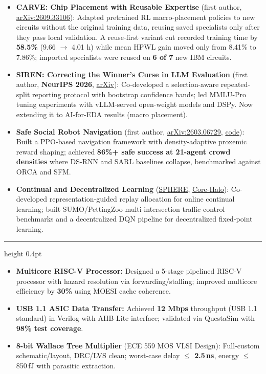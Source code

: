\documentclass[letterpaper,11pt]{article}
\newcommand{\ressection}[1]{%
  \vspace{3pt}%
  \noindent{\large\bfseries\scshape #1}%
  \par\vspace{1pt}%
  \hrule height 0.4pt%
  \vspace{2pt}%
}
\begin{document}
\vspace{2pt}
\begin{itemize}[leftmargin=1.2em, topsep=3pt, itemsep=3pt, parsep=0pt]
  \item \textbf{CARVE: Chip Placement with Reusable Expertise} (first author, \href{https://arxiv.org/abs/2609.33106}{arXiv:2609.33106}): Adapted pretrained RL macro-placement policies to new circuits without the original training data, reusing saved specialists only after they pass local validation. A reuse-first variant cut recorded training time by \textbf{58.5\%} (9.66 $\rightarrow$ 4.01 h) while mean HPWL gain moved only from 8.41\% to 7.86\%; imported specialists were reused on \textbf{6 of 7} new IBM circuits.
  \item \textbf{SIREN: Correcting the Winner's Curse in LLM Evaluation} (first author, \textbf{NeurIPS 2026}, \href{https://arxiv.org/abs/2605.05973}{arXiv}): Co-developed a selection-aware repeated-split reporting protocol with bootstrap confidence bands; led MMLU-Pro tuning experiments with vLLM-served open-weight models and DSPy. Now extending it to AI-for-EDA results (macro placement).
  \item \textbf{Safe Social Robot Navigation} (first author, \href{https://arxiv.org/abs/2603.06729}{arXiv:2603.06729}, \href{https://github.com/jefferyz001/PSS-Social}{code}): Built a PPO-based navigation framework with density-adaptive proxemic reward shaping; achieved \textbf{86\%+ safe success at 21-agent crowd densities} where DS-RNN and SARL baselines collapse, benchmarked against ORCA and SFM.
  \item \textbf{Continual and Decentralized Learning} (\href{https://arxiv.org/abs/2609.33725}{SPHERE}, \href{https://arxiv.org/abs/2605.08681}{Core-Halo}): Co-developed representation-guided replay allocation for online continual learning; built SUMO/PettingZoo multi-intersection traffic-control benchmarks and a decentralized DQN pipeline for decentralized fixed-point learning.
\end{itemize}

\ressection{Selected Hardware Projects}

\begin{itemize}[leftmargin=1.2em, topsep=2pt, itemsep=3pt, parsep=0pt]
  \item \textbf{Multicore RISC-V Processor:} Designed a 5-stage pipelined RISC-V processor with hazard resolution via forwarding/stalling; improved multicore efficiency by \textbf{30\%} using MOESI cache coherence.
  \item \textbf{USB 1.1 ASIC Data Transfer:} Achieved \textbf{12 Mbps} throughput (USB 1.1 standard) in Verilog with AHB-Lite interface; validated via QuestaSim with \textbf{98\% test coverage}.
  \item \textbf{8-bit Wallace Tree Multiplier} (ECE 559 MOS VLSI Design): Full-custom schematic/layout, DRC/LVS clean; worst-case delay \textbf{$\leq$ 2.5\,ns}, energy $\leq$ 850\,fJ with parasitic extraction.
\end{itemize}
\end{document}
